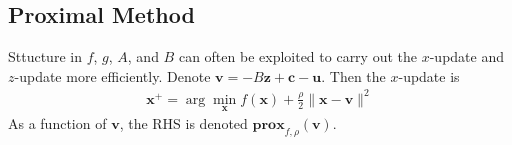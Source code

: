 \subsection{Proximal Method}

Sttucture in $f$, $g$, $A$, and $B$ can often be exploited
to carry out the $x$-update and $z$-update more efficiently.
Denote $\mathbf{v} = -B\mathbf{z} + \mathbf{c} - \mathbf{u}$.
Then the $x$-update is
\begin{align}
    \mathbf{x}^+ = \arg\min_\mathbf{x} f(\mathbf{x}) + \frac{\rho}{2}
    \parallel \mathbf{x} - \mathbf{v} \parallel^2
\end{align}
As a function of $\mathbf{v}$, the RHS is denoted $\mathbf{prox}_{f, \rho}(\mathbf{v})$.